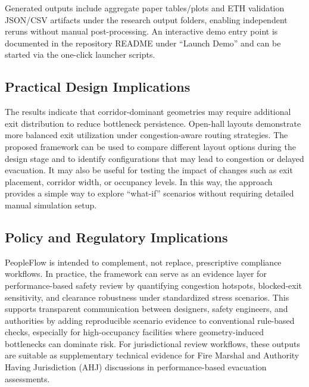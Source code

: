 \documentclass[utf8]{FrontiersinHarvard}
\begin{document}
Generated outputs include aggregate paper tables/plots and ETH validation JSON/CSV artifacts under the research output folders, enabling independent reruns without manual post-processing. An interactive demo entry point is documented in the repository README under ``Launch Demo'' and can be started via the one-click launcher scripts.

\subsection{Practical Design Implications}
The results indicate that corridor-dominant geometries may require additional exit distribution to reduce bottleneck persistence. Open-hall layouts demonstrate more balanced exit utilization under congestion-aware routing strategies. The proposed framework can be used to compare different layout options during the design stage and to identify configurations that may lead to congestion or delayed evacuation. It may also be useful for testing the impact of changes such as exit placement, corridor width, or occupancy levels. In this way, the approach provides a simple way to explore “what-if” scenarios without requiring detailed manual simulation setup.

\subsection{Policy and Regulatory Implications}
PeopleFlow is intended to complement, not replace, prescriptive compliance workflows. In practice, the framework can serve as an evidence layer for performance-based safety review by quantifying congestion hotspots, blocked-exit sensitivity, and clearance robustness under standardized stress scenarios. This supports transparent communication between designers, safety engineers, and authorities by adding reproducible scenario evidence to conventional rule-based checks, especially for high-occupancy facilities where geometry-induced bottlenecks can dominate risk.
For jurisdictional review workflows, these outputs are suitable as supplementary technical evidence for Fire Marshal and Authority Having Jurisdiction (AHJ) discussions in performance-based evacuation assessments.
\end{document}
